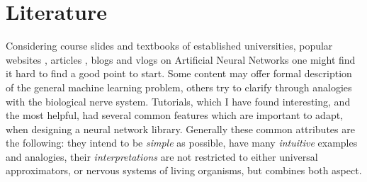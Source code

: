\chapter{Literature}


Considering course slides \cite{stanfordlectures, oxfordlectures} and textbooks \cite{Goodfellow-et-al-2016-Book, werbos1994roots, bengio2009learning} of established universities, popular websites \cite{deeplearningdotnet, pedregosa2011scikit}, articles \cite{lecun2015deep}, blogs \cite{gibiansky, karpathyblog} and vlogs \cite{vlog1} on Artificial Neural Networks one might find it hard to find a good point to start. 
Some content may offer formal description of the general machine learning problem, others try to clarify through analogies with the biological nerve system.
Tutorials, which I have found interesting, and the most helpful, had several common features which are important to adapt, when designing a neural network library. 
Generally these common attributes are the following: 
they intend to be \emph{simple} as possible, 
have many \emph{intuitive} examples and analogies,
their \emph{interpretations} are not restricted to either universal approximators, or nervous systems of living organisms, but combines both aspect.